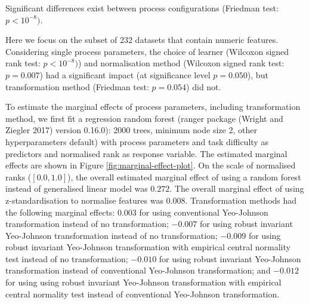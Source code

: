 \documentclass[
  a4paper,
]{article}
\begin{document}
Significant differences exist between process configurations (Friedman
test: \(p < 10^{-8})\).

Here we focus on the subset of 232 datasets that contain numeric
features. Considering single process parameters, the choice of learner
(Wilcoxon signed rank test: \(p < 10^{-8})\)) and normalisation method
(Wilcoxon signed rank test: \(p = 0.007\)) had a significant impact (at
significance level \(p = 0.050\)), but transformation method (Friedman
test: \(p = 0.054\)) did not.

To estimate the marginal effects of process parameters, including
transformation method, we first fit a regression random forest (ranger
package (Wright and Ziegler 2017) version 0.16.0): 2000 trees, minimum
node size 2, other hyperparameters default) with process parameters and
task difficulty as predictors and normalised rank as response variable.
The estimated marginal effects are shown in Figure
\ref{fig:marginal-effect-plot}. On the scale of normalised ranks
(\([0.0, 1.0]\)), the overall estimated marginal effect of using a
random forest instead of generalised linear model was \(0.272\). The
overall marginal effect of using z-standardisation to normalise features
was \(0.008\). Transformation methods had the following marginal
effects: \(0.003\) for using conventional Yeo-Johnson transformation
instead of no transformation; \(-0.007\) for using robust invariant
Yeo-Johnson transformation instead of no transformation; \(-0.009\) for
using robust invariant Yeo-Johnson transformation with empirical central
normality test instead of no transformation; \(-0.010\) for using robust
invariant Yeo-Johnson transformation instead of conventional Yeo-Johnson
transformation; and \(-0.012\) for using using robust invariant
Yeo-Johnson transformation with empirical central normality test instead
of conventional Yeo-Johnson transformation.
\end{document}
